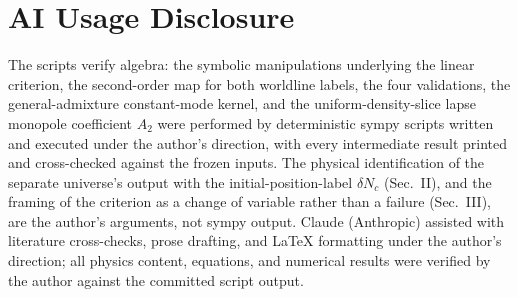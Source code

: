 \documentclass[aps,prd,twocolumn,superscriptaddress,showpacs,preprintnumbers,nofootinbib,longbibliography,floatfix]{revtex4-2}
\begin{document}
\section*{AI Usage Disclosure}
The scripts verify algebra: the symbolic manipulations underlying the linear criterion,
the second-order map for both worldline labels, the four validations, the general-admixture
constant-mode kernel, and the uniform-density-slice lapse monopole coefficient $A_2$ were
performed by deterministic sympy scripts written and executed under the author's direction,
with every intermediate result printed and cross-checked against the frozen inputs. The
physical identification of the separate universe's output with the initial-position-label
$\delta N_c$ (Sec.~II), and the framing of the criterion as a change of variable rather
than a failure (Sec.~III), are the author's arguments, not sympy output. Claude
(Anthropic) assisted with literature cross-checks, prose drafting, and LaTeX formatting
under the author's direction; all physics content, equations, and numerical results were
verified by the author against the committed script output.
\end{document}
